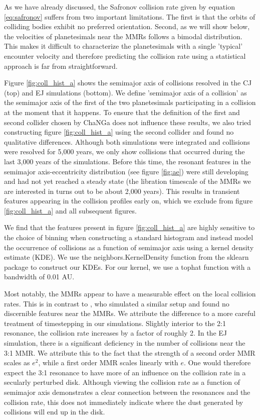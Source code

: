 \documentclass[onecolumn]{aastex63}
\begin{document}
As we have already discussed, the Safronov collision rate given by equation \ref{eq:safronov} suffers from two important limitations. The
first is that the orbits of colliding bodies exhibit no preferred orientation. Second, as we will show below, the velocities of planetesimals 
near the MMRs follows a bimodal distribution. This makes it difficult to characterize the planetesimals with a single 'typical' encounter 
velocity and therefore predicting the collision rate using a statistical approach is far from straightforward.

Figure \ref{fig:coll_hist_a} shows the semimajor axis of collisions resolved in the CJ (top) and EJ simulations (bottom). We define 
'semimajor axis of a collision' as the semimajor axis of the first of the two planetesimals participating in a collision at the 
moment that it happens. To ensure that the definition of the first and second collider chosen by {\sc ChaNGa} does not influence 
these results, we also tried constructing figure \ref{fig:coll_hist_a} using the second collider and found no qualitative differences. 
Although both simulations were integrated and collisions were resolved for 5,000 years, we only show collisions that occurred during 
the last 3,000 years of the simulations. Before this time, the resonant features in the semimajor axis-eccentricity distribution (see 
figure \ref{fig:ae}) were still developing and had not yet reached a steady state (the libration timescale of the MMRs we are interested in turns out to be about 2,000 years). This results in transient features appearing in the collision profiles early on, which we exclude from figure \ref{fig:coll_hist_a} and all subsequent figures.

We find that the features present in figure \ref{fig:coll_hist_a} are highly sensitive to the choice of binning when constructing a standard histogram and instead model the occurrence of collisions as a function of semimajor axis using a kernel density estimate (KDE). We use the {\sc neighbors.KernelDensity} function from the {\sc sklearn} \citep{scikit-learn} package to construct our KDEs. For our kernel, we use a tophat function with a bandwidth of 0.01 AU.

Most notably, the MMRs appear to have a measurable effect on the local collision rates. This is in contrast to \citet{2000Icar..143...45R}, 
who simulated a similar setup and found no discernible features near the MMRs. We attribute the difference to a more careful treatment of 
timestepping in our simulations. Slightly interior to the 2:1 resonance, the collision rate increases by a factor of roughly 2. In the EJ 
simulation, there is a significant deficiency in the number of collisions near the 3:1 MMR. We attribute this to the fact that the strength of a 
second order MMR scales as $e^{2}$, while a first order MMR scales linearly with $e$. One would therefore expect the 3:1 resonance to 
have more of an influence on the collision rate in a secularly perturbed disk. Although viewing the collision rate as a function of semimajor 
axis demonstrates a clear connection between the resonances and the collision rate, this does not immediately indicate where the dust 
generated by collisions will end up in the disk.
\end{document}
